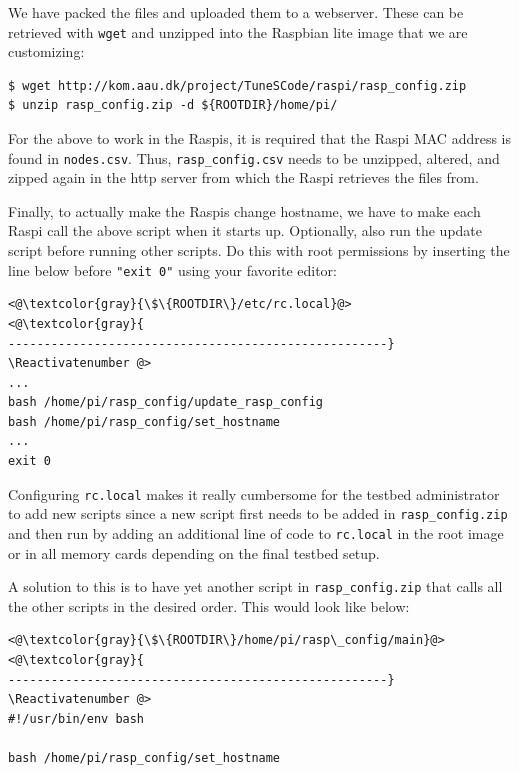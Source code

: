 We have packed the files and uploaded them to a webserver. These can be
retrieved with \texttt{wget} and unzipped into the Raspbian lite image that
we are customizing:

\begin{lstlisting}[]
$ wget http://kom.aau.dk/project/TuneSCode/raspi/rasp_config.zip
$ unzip rasp_config.zip -d ${ROOTDIR}/home/pi/
\end{lstlisting}
\FloatBarrier
\vspace{-5mm}

For the above to work in the \ac{Raspi}s, it is required that the \ac{Raspi}
\ac{MAC} address is found in \texttt{nodes.csv}. Thus,
\texttt{rasp\_config.csv} needs to be unzipped, altered, and zipped again in
the http server from which the \ac{Raspi} retrieves the files from.


Finally, to actually make the \ac{Raspi}s change hostname, we have to make
each \ac{Raspi} call the above script when it starts up. Optionally,
also run the update script before running other scripts.
Do this with root permissions by inserting the line below before
\texttt{"exit 0"} using your favorite editor:

\Suppressnumber\begin{lstlisting}[]
<@\textcolor{gray}{\$\{ROOTDIR\}/etc/rc.local}@>
<@\textcolor{gray}{
-----------------------------------------------------}
\Reactivatenumber @>
...
bash /home/pi/rasp_config/update_rasp_config
bash /home/pi/rasp_config/set_hostname
...
exit 0
\end{lstlisting}
\FloatBarrier
\vspace{-5mm}

Configuring \texttt{rc.local} makes it really cumbersome for the testbed
administrator to add new scripts since a new script first needs to be added
in \texttt{rasp\_config.zip} and then run by adding an additional line of code
to \texttt{rc.local} in the root image or in all memory cards depending on
the final testbed setup.

A solution to this is to have yet another script in \texttt{rasp\_config.zip}
that calls all the other scripts in the desired order. This would look like
below:
\Suppressnumber\begin{lstlisting}[]
<@\textcolor{gray}{\$\{ROOTDIR\}/home/pi/rasp\_config/main}@>
<@\textcolor{gray}{
-----------------------------------------------------}
\Reactivatenumber @>
#!/usr/bin/env bash

bash /home/pi/rasp_config/set_hostname
\end{lstlisting}
\FloatBarrier
\vspace{-5mm}

